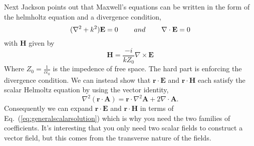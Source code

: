 \documentclass[aps,prl,twocolumn]{revtex4-1}
\begin{document}
Next Jackson points out that Maxwell's equations can be written in the form
of the helmholtz equation and a divergence condition,
\begin{equation}
  \label{eq:maxwells}
  (\nabla^2 + k^2)\mathbf{E} = 0  \hspace{8mm}and\hspace{8mm}
  \nabla \cdot \mathbf{E} = 0
\end{equation}
with $\mathbf{H}$ given by
\begin{equation}
  \label{eq:maxwells2}
  \mathbf{H} = \frac{-i}{kZ_0} \nabla \times \mathbf{E}
\end{equation}
Where $Z_0=\frac{1}{c \epsilon_0}$ is the impedence of free space.
The hard part is enforcing the divergence condition. We can instead show
that $\mathbf{r} \cdot \mathbf{E}$ and $\mathbf{r} \cdot \mathbf{H}$ each
satisfy the scalar Helmoltz equation by using the vector identity,
\begin{equation}
  \label{eq:vectoridentity}
   \nabla^2 (\mathbf{r}\cdot \mathbf{A}) = \mathbf{r}\cdot \nabla^2\mathbf{A}
                                          +2 \nabla \cdot \mathbf{A}.
\end{equation}
Consequently we can expand $\mathbf{r} \cdot \mathbf{E}$ and
 $\mathbf{r} \cdot \mathbf{H}$ in terms of Eq.~(\ref{eq:generalscalarsolution})
which is why you need the two families of coefficients. It's interesting
that you only need two scalar fields to construct a vector field, but this
comes from the transverse nature of the fields.
\end{document}
